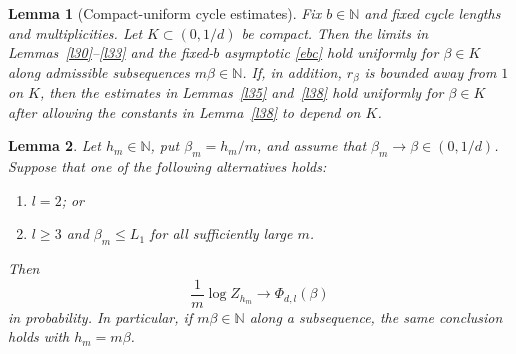 \documentclass[10pt,a4paper]{amsart}
\newtheorem{lemma}{Lemma}
\begin{document}
\begin{lemma}[Compact-uniform cycle estimates]\label{lem:cycle-uniformity}
Fix $b\in\mathbb N$ and fixed cycle lengths and multiplicities.  Let
$K\subset(0,1/d)$ be compact.  Then the limits in Lemmas~\ref{l30}--\ref{l33}
and the fixed-$b$ asymptotic \eqref{ebc} hold uniformly for
$\beta\in K$ along admissible subsequences $m\beta\in\mathbb N$.  If, in addition,
$r_\beta$ is bounded away from $1$ on $K$, then the estimates in Lemmas~\ref{l35}
and~\ref{l38} hold uniformly for $\beta\in K$ after allowing the constants in
Lemma~\ref{l38} to depend on $K$.
\end{lemma}

\begin{lemma}\label{l51}
Let $h_m\in\mathbb N$, put $\beta_m=h_m/m$, and assume that
$\beta_m\to\beta\in(0,1/d)$.  Suppose that one of the following alternatives holds:
\begin{enumerate}
\item $l=2$; or
\item $l\ge3$ and $\beta_m\le L_1$ for all sufficiently large $m$.
\end{enumerate}
Then
\begin{equation}\label{cfe}
  \frac1m\log Z_{h_m}\longrightarrow \Phi_{d,l}(\beta)
\end{equation}
in probability.  In particular, if $m\beta\in\mathbb N$ along a subsequence, the
same conclusion holds with $h_m=m\beta$.
\end{lemma}
\end{document}
